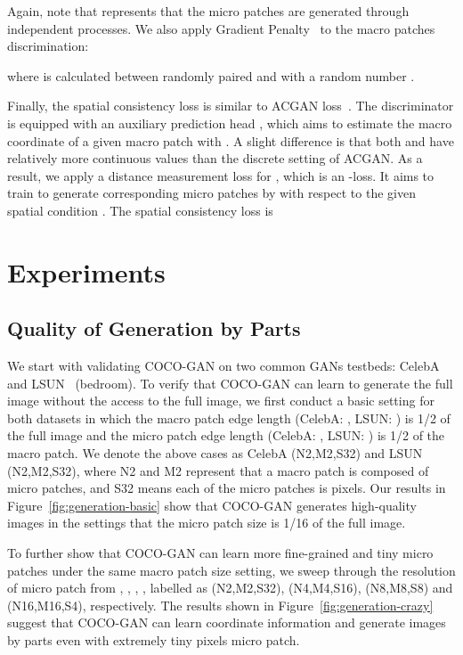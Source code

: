 \documentclass{article}
\newcommand{\modelName}{COCO-GAN }
\begin{document}
Again, note that  represents that the micro patches are generated through independent processes. We also apply Gradient Penalty~\cite{WGAN-GP} to the macro patches discrimination:
    
    where  is calculated between randomly paired  and  with a random number .

    Finally, the spatial consistency loss  is similar to ACGAN loss~\cite{ACGAN}. The discriminator is equipped with an auxiliary prediction head , which aims to estimate the macro coordinate of a given macro patch with . A slight difference is that both  and  have relatively more continuous values than the discrete setting of ACGAN. As a result, we apply a distance measurement loss for , which is an -loss. It aims to train  to generate corresponding micro patches by  with respect to the given spatial condition . The spatial consistency loss is
     



 \section{Experiments}

    \subsection{Quality of Generation by Parts}
    
        \label{exp:generation-image-quality}
    
        We start with validating \modelName on two common GANs testbeds: CelebA~\cite{CelebA} and LSUN~\cite{LSUN} (bedroom). To verify that \modelName can learn to generate the full image without the access to the full image, we first conduct a basic setting for both datasets in which the macro patch edge length (CelebA: , LSUN: ) is 1/2 of the full image and the micro patch edge length (CelebA: , LSUN: ) is 1/2 of the macro patch. We denote the above cases as CelebA (N2,M2,S32) and LSUN (N2,M2,S32), where N2 and M2 represent that a macro patch is composed of  micro patches, and S32 means each of the micro patches is  pixels.
        Our results in Figure~\ref{fig:generation-basic} show that \modelName generates high-quality images in the settings that the micro patch size is 1/16 of the full image.
        
        To further show that \modelName can learn more fine-grained and tiny micro patches under the same macro patch size setting, we sweep through the resolution of micro patch from , , , , labelled as (N2,M2,S32), (N4,M4,S16), (N8,M8,S8) and (N16,M16,S4), respectively. The results shown in Figure~\ref{fig:generation-crazy} suggest that \modelName can learn coordinate information and generate images by parts even with extremely tiny  pixels micro patch. 
        
\end{document}
